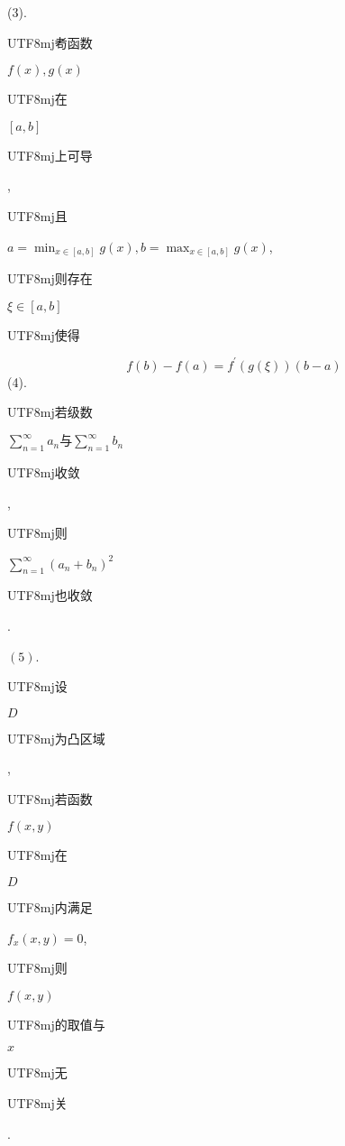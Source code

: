 \documentclass[10pt]{article}
\begin{document}
(3). \begin{CJK}{UTF8}{mj}耇函数\end{CJK} $f(x), g(x)$ \begin{CJK}{UTF8}{mj}在\end{CJK} $[a, b]$ \begin{CJK}{UTF8}{mj}上可导\end{CJK}, \begin{CJK}{UTF8}{mj}且\end{CJK} $a=\min _{x \in[a, b]} g(x), b=\max _{x \in[a, b]} g(x)$, \begin{CJK}{UTF8}{mj}则存在\end{CJK} $\xi \in[a, b]$ \begin{CJK}{UTF8}{mj}使得\end{CJK}
$$
f(b)-f(a)=f^{\prime}(g(\xi))(b-a)
$$
(4). \begin{CJK}{UTF8}{mj}若级数\end{CJK} $\sum_{n=1}^{\infty} a_{n} 与 \sum_{n=1}^{\infty} b_{n}$ \begin{CJK}{UTF8}{mj}收敛\end{CJK}, \begin{CJK}{UTF8}{mj}则\end{CJK} $\sum_{n=1}^{\infty}\left(a_{n}+b_{n}\right)^{2}$ \begin{CJK}{UTF8}{mj}也收敛\end{CJK}.

$(5)$. \begin{CJK}{UTF8}{mj}设\end{CJK} $D$ \begin{CJK}{UTF8}{mj}为凸区域\end{CJK}, \begin{CJK}{UTF8}{mj}若函数\end{CJK} $f(x, y)$ \begin{CJK}{UTF8}{mj}在\end{CJK} $D$ \begin{CJK}{UTF8}{mj}内满足\end{CJK} $f_{x}(x, y)=0$, \begin{CJK}{UTF8}{mj}则\end{CJK} $f(x, y)$ \begin{CJK}{UTF8}{mj}的取值与\end{CJK} $x$ \begin{CJK}{UTF8}{mj}无\end{CJK} \begin{CJK}{UTF8}{mj}关\end{CJK}.
\end{document}

